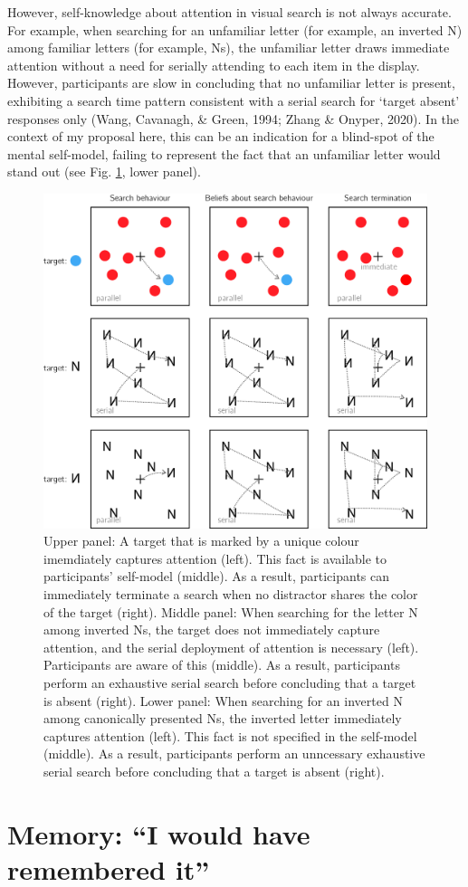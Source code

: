 \documentclass[12pt,twoside]{reedthesis}
\begin{document}
However, self-knowledge about attention in visual search is not always accurate. For example, when searching for an unfamiliar letter (for example, an inverted N) among familiar letters (for example, Ns), the unfamiliar letter draws immediate attention without a need for serially attending to each item in the display. However, participants are slow in concluding that no unfamiliar letter is present, exhibiting a search time pattern consistent with a serial search for `target absent' responses only (Wang, Cavanagh, \& Green, 1994; Zhang \& Onyper, 2020). In the context of my proposal here, this can be an indication for a blind-spot of the mental self-model, failing to represent the fact that an unfamiliar letter would stand out (see Fig. \ref{fig:intro-search}, lower panel).
\begin{figure}
\includegraphics[width=0.7\linewidth]{figure/intro/search} \caption[Computational models of visual search]{Upper panel: A target that is marked by a unique colour imemdiately captures attention (left). This fact is available to participants' self-model (middle). As a result, participants can immediately terminate a search when no distractor shares the color of the target (right). Middle panel: When searching for the letter N among inverted Ns, the target does not immediately capture attention, and the serial deployment of attention is necessary (left). Participants are aware of this (middle). As a result, participants perform an exhaustive serial search before concluding that a target is absent (right). Lower panel: When searching for an inverted N among canonically presented Ns, the inverted letter immediately captures attention (left). This fact is not specified in the self-model (middle). As a result, participants perform an unncessary exhaustive serial search before concluding that a target is absent (right).}\label{fig:intro-search}
\end{figure}
\hypertarget{memory-i-would-have-remembered-it}{%
\section{Memory: ``I would have remembered it''}\label{memory-i-would-have-remembered-it}}
\end{document}
